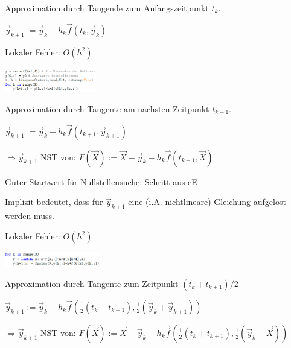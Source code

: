 \vspace{1\baselineskip}


Approximation durch Tangende zum Anfangszeitpunkt $t_k$.

$\vec{y}_{k+1} := \vec{y}_k + h_k \vec{f}(t_k,\vec{y}_k)$

Lokaler Fehler: $O(h^2)$

\begin{center}
    \includegraphics[width=0.3\textwidth]{Figures/eE.png}
\end{center}

\vspace{1\baselineskip}


Approximation durch Tangente am nächsten Zeitpunkt $t_{k+1}$.

$\vec{y}_{k+1} := \vec{y}_k + h_k \vec{f}(t_{k+1} , \vec{y}_{k+1})$

$\Rightarrow \vec{y}_{k+1}$ NST von: $F(\vec{X}) := \vec{X} - \vec{y}_k - h_k \vec{f}(t_{k+1},\vec{X})$


Guter Startwert für Nullstellensuche: Schritt aus eE

Implizit bedeutet, dass für $\vec{y}_{k+1}$ eine (i.A. nichtlineare) Gleichung aufgelöst
werden muss.

Lokaler Fehler: $O(h^2)$

\begin{center}
    \includegraphics[width=0.31\textwidth]{Figures/iE.png}
\end{center}

\vspace{1\baselineskip}


Approximation durch Tangente zum Zeitpunkt $(t_k + t_{k+1})/2$

$\vec{y}_{k+1} := \vec{y}_k + h_k \vec{f}(\frac{1}{2}(t_k+t_{k+1}),\frac{1}{2}(\vec{y}_k + \vec{y}_{k+1}))$

$\Rightarrow \vec{y}_{k+1}$ NST von: $F(\vec{X}) := \vec{X} - \vec{y}_k - h_k \vec{f}(\frac{1}{2}(t_k + t_{k+1}),\frac{1}{2}(\vec{y}_k + \vec{X}))$

